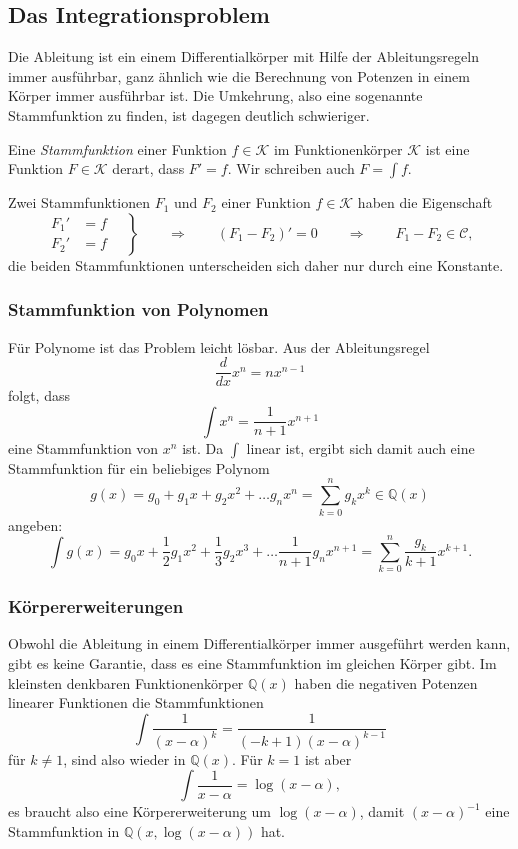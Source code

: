 %
%
%
\subsection{Das Integrationsproblem
\label{buch:integral:subsection:integrationsproblem}}
%
Die Ableitung ist ein einem Differentialkörper mit Hilfe der Ableitungsregeln
immer ausführbar, ganz ähnlich wie die Berechnung von Potenzen in einem Körper
immer ausführbar ist.
Die Umkehrung, also eine sogenannte Stammfunktion zu finden, ist dagegen
deutlich schwieriger.

\begin{definition}
Eine {\em Stammfunktion} einer Funktion $f\in\mathscr{K}$ im Funktionenkörper
$\mathscr{K}$ ist eine Funktion $F\in\mathscr{K}$ derart, dass $F'=f$.
Wir schreiben auch $F=\int f$.
\end{definition}

Zwei Stammfunktionen $F_1$ und $F_2$ einer Funktion $f\in\mathscr{K}$
haben die Eigenschaft
\[
\left.\begin{aligned}
F_1' &= f \\
F_2' &= f 
\end{aligned}\quad\right\}
\qquad
\Rightarrow
\qquad
(F_1-F_2)' = 0
\qquad\Rightarrow\qquad
F_1-F_2\in\mathscr{C},
\]
die beiden Stammfunktionen unterscheiden sich daher nur durch eine
Konstante.

\subsubsection{Stammfunktion von Polynomen}
Für Polynome ist das Problem leicht lösbar.
Aus der Ableitungsregel
\[
\frac{d}{dx} x^n = nx^{n-1}
\]
folgt, dass
\[
\int x^n = \frac{1}{n+1} x^{n+1}
\]
eine Stammfunktion von $x^n$ ist.
Da $\int$ linear ist, ergibt sich damit auch eine Stammfunktion für
ein beliebiges Polynom
\[
g(x)
=
g_0 + g_1x + g_2x^2 + \dots g_nx^n
=
\sum_{k=0}^n g_kx^k
\in\mathbb{Q}(x)
\]
angeben:
\begin{equation}
\int g(x)
=
g_0x + \frac12g_1x^2 + \frac13g_2x^3 + \dots \frac{1}{n+1}g_nx^{n+1}
=
\sum_{k=0}^n 
\frac{g_k}{k+1}x^{k+1}.
\label{buch:integral:iproblem:eqn:polyintegral}
\end{equation}

\subsubsection{Körpererweiterungen}
Obwohl die Ableitung in einem Differentialkörper immer ausgeführt werden 
kann, gibt es keine Garantie, dass es eine Stammfunktion im gleichen 
Körper gibt.
Im kleinsten denkbaren Funktionenkörper $\mathbb{Q}(x)$
haben die negativen Potenzen linearer Funktionen die Stammfunktionen
\[
\int
\frac{1}{(x-\alpha)^k}
=
\frac{1}{(-k+1)(x-\alpha)^{k-1}}
\]
für $k\ne 1$, sind also wieder in $\mathbb{Q}(x)$.
Für $k=1$ ist aber
\[
\int \frac{1}{x-\alpha}
=
\log(x-\alpha),
\]
es braucht also eine Körpererweiterung um $\log(x-\alpha)$, damit
$(x-\alpha)^{-1}$ eine Stammfunktion in $\mathbb{Q}(x,\log(x-\alpha))$
hat.

